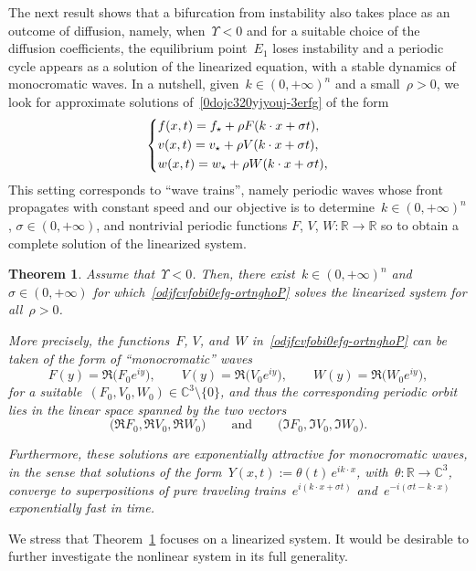 \documentclass[12pt]{amsart}
\newcommand{\R}{\mathbb{R}}
\newcommand{\C}{\mathbb{C}}
\numberwithin{equation}{section}
\newtheorem{theorem}{Theorem}[section]
\begin{document}
The next result shows that a bifurcation from instability also takes place as an outcome of diffusion, namely, when~$\Upsilon<0$ and for a suitable choice of the diffusion coefficients, the equilibrium point~$E_1$ loses instability and a periodic cycle appears as a solution of the linearized equation, with a stable dynamics
of monocromatic waves. In a nutshell, given~$k\in(0,+\infty)^n$ and a small~$\rho>0$, we look for approximate
solutions of~\eqref{0dojc320yjyouj-3erfg} of the form
\begin{equation}\label{odjfcvfobi0efg-ortnghoP} \begin{dcases} f(x,t)=f_\star+\rho F ( k\cdot x+\sigma t),\\
v(x,t)=v_\star+\rho V ( k\cdot x+\sigma t),\\
w(x,t)=w_\star+\rho W ( k\cdot x+\sigma t),
\end{dcases}
\end{equation}
This setting corresponds to
``wave trains'', namely periodic waves whose front propagates with constant speed
and our objective is to determine~$k\in(0,+\infty)^n$, $\sigma\in(0,+\infty)$,
and nontrivial periodic functions $F$,
$V$, $W:\R\to\R$
so to obtain a complete solution of the linearized system.

\begin{theorem}\label{ojdfc30-t7ujsbdnfcvb}
Assume that~$\Upsilon<0$. 
Then, there exist~$k\in(0,+\infty)^n$ and~$\sigma\in(0,+\infty)$
for which~\eqref{odjfcvfobi0efg-ortnghoP} solves the linearized system for all~$\rho>0$.

More precisely, the functions~$F$, $V$, and~$W$ in~\eqref{odjfcvfobi0efg-ortnghoP} can be taken of the form
of ``monocromatic'' waves 
$$F(y)=\Re\big(F_0 e^{iy}\big),\qquad
V(y)=\Re\big(V_0 e^{iy}\big),\qquad W(y)=\Re\big(W_0 e^{iy}\big),$$
for a suitable~$(F_0, V_0, W_0)\in\C^3\setminus\{0\}$, and thus the corresponding periodic orbit lies in the linear space spanned by
the two vectors
$$ \big( \Re F_0,\Re V_0,\Re W_0\big)\qquad{\mbox{and}}\qquad
 \big( \Im F_0,\Im V_0,\Im W_0\big).$$

Furthermore, these solutions are exponentially attractive
for monocromatic waves, in the sense that solutions of the form~$Y(x,t):=\theta(t)\,e^{ik\cdot x}$, with~$\theta:\R\to\C^3$,
converge to superpositions of pure traveling trains~$e^{i(k\cdot x+\sigma t)}$ and~$e^{-i(\sigma t-k\cdot x)}$
exponentially fast in time.
\end{theorem}

We stress that 
Theorem~\ref{ojdfc30-t7ujsbdnfcvb} focuses on a linearized system. It would be desirable
to further investigate the nonlinear system in its full generality.
\end{document}
